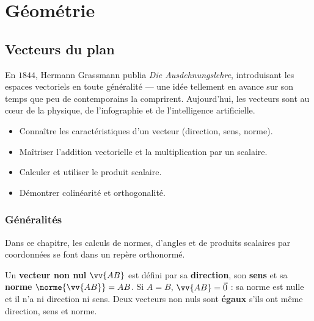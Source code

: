 \part{G\'eom\'etrie}

\chapter{Vecteurs du plan}


\begin{anecdote}
En $1844$, Hermann Grassmann publia \textit{Die Ausdehnungslehre}, introduisant
les espaces vectoriels en toute g\'en\'eralit\'e --- une id\'ee tellement en avance
sur son temps que peu de contemporains la comprirent. Aujourd'hui, les vecteurs
sont au c\oe ur de la physique, de l'infographie et de l'intelligence artificielle.
\end{anecdote}

\begin{objectifs}
\begin{itemize}
  \item Conna\^itre les caract\'eristiques d'un vecteur (direction, sens, norme).
  \item Ma\^itriser l'addition vectorielle et la multiplication par un scalaire.
  \item Calculer et utiliser le produit scalaire.
  \item D\'emontrer colin\'earit\'e et orthogonalit\'e.
\end{itemize}
\end{objectifs}

\section{G\'en\'eralit\'es}
Dans ce chapitre, les calculs de normes, d'angles et de produits scalaires
par coordonn\'ees se font dans un rep\`ere orthonorm\'e.

\begin{defn}[Vecteur]
Un \textbf{vecteur non nul} $\vv{AB}$ est d\'efini par sa \textbf{direction},
son \textbf{sens} et sa \textbf{norme} $\norme{\vv{AB}} = AB$.
Si $A=B$, $\vv{AB}=\vec0$ : sa norme est nulle et il n'a ni direction ni sens.
Deux vecteurs non nuls sont \textbf{\'egaux} s'ils ont m\^{e}me direction, sens et norme.
\end{defn}

